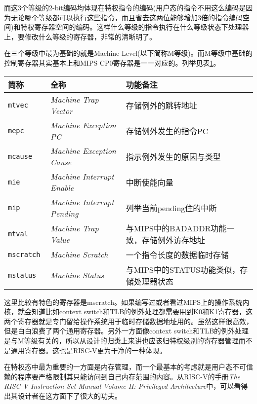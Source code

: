 \begin{enumerate}
	而这3个等级的2-bit编码均体现在特权指令的编码(用户态的指令不用这么编码是因为无论哪个等级都可以执行这些指令，而且省去这两位能够增加3倍的指令编码空间)和特权寄存器空间的编码。这样什么等级的指令执行在什么等级状态下处理器上，要修改什么等级的寄存器，非常的清晰明了。
	
	在三个等级中最为基础的就是Machine Level(以下简称M等级)。而M等级中基础的控制寄存器其实基本上和MIPS CP0寄存器是一一对应的。列举见表\ref{tab:sampleofCSR}。
	\begin{table}[!htbp]
		\label{tab:sampleofCSR}
		\centering
		\footnotesize%
		\setlength{\tabcolsep}{4pt}%
		\renewcommand{\arraystretch}{1.2}%
		\begin{tabular}{lll}
			\hline
			简称 & 全称 & 功能备注 \\%
			\hline
			\tt mtvec    & \textit{Machine Trap Vector}       & 存储例外的跳转地址 \\
			\tt mepc     & \textit{Machine Exception PC}      & 存储例外发生的指令PC \\
			\tt mcause   & \textit{Machine Exception Cause}   & 指示例外发生的原因与类型 \\
			\tt mie      & \textit{Machine Interrupt Enable}  & 中断使能向量 \\
			\tt mip      & \textit{Machine Interrupt Pending} & 列举当前pending住的中断 \\
			\tt mtval    & \textit{Machine Trap Value} & 与MIPS中的BADADDR功能一致，存储例外访存地址 \\
			\tt mscratch & \textit{Machine Scratch}    & 一个指令长度的数据临时存储 \\
			\tt mstatus  & \textit{Machine Status}     & 与MIPS中的STATUS功能类似，存储处理器状态 \\
			\hline
		\end{tabular}
	\end{table}
	
	这里比较有特色的寄存器是mscratch。如果编写过或者看过MIPS上的操作系统内核，就会知道比如context switch和TLB的例外处理都需要用到K0和K1寄存器，这两个寄存器就是专门留给操作系统用于临时存储数据地址用的。虽然这样很高效，但是白白浪费了两个通用寄存器。另外一方面像context switch和TLB的例外处理是与M等级有关的，所以从设计的归类上来讲也应该归特权级别的寄存器管理而不是通用寄存器。这也是RISC-V更为干净的一种体现。
	
	在特权态中最为重要的一方面是内存管理，而一个最基本的考虑就是用户态不可信赖的程序要严格限制其只能访问到自己内存范围的内容。从RISC-V的手册\textit{The RISC-V Instruction Set Manual Volume II: Privileged Architecture}中，可以看得出其设计者在这方面下了很大的功夫。
	

\end{enumerate}

